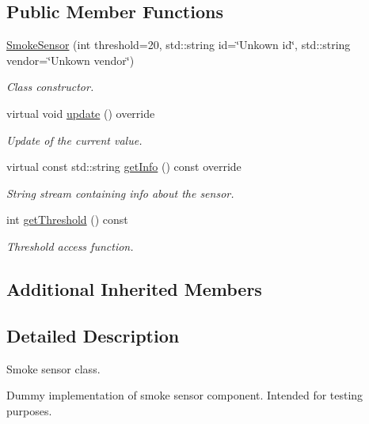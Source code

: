 \subsection*{Public Member Functions}
\begin{DoxyCompactItemize}
\item 
\hyperlink{classSmokeSensor_a0a8061f510440bd20f6ca7238b23516c}{Smoke\+Sensor} (int threshold=20, std\+::string id=\char`\"{}Unkown id\char`\"{}, std\+::string vendor=\char`\"{}Unkown vendor\char`\"{})
\begin{DoxyCompactList}\small\item\em Class constructor. \end{DoxyCompactList}\item 
virtual void \hyperlink{classSmokeSensor_a31bc900b0d1c5c893f8555fdcbe4266b}{update} () override
\begin{DoxyCompactList}\small\item\em Update of the current value. \end{DoxyCompactList}\item 
virtual const std\+::string \hyperlink{classSmokeSensor_a2cc7e7b2da913abb8aefcd92d50ef046}{get\+Info} () const override\hypertarget{classSmokeSensor_a2cc7e7b2da913abb8aefcd92d50ef046}{}\label{classSmokeSensor_a2cc7e7b2da913abb8aefcd92d50ef046}

\begin{DoxyCompactList}\small\item\em String stream containing info about the sensor. \end{DoxyCompactList}\item 
int \hyperlink{classSmokeSensor_add325306c6a33436bc9053721cbdb88b}{get\+Threshold} () const 
\begin{DoxyCompactList}\small\item\em Threshold access function. \end{DoxyCompactList}\end{DoxyCompactItemize}
\subsection*{Additional Inherited Members}


\subsection{Detailed Description}
Smoke sensor class. 

Dummy implementation of smoke sensor component. Intended for testing purposes. 

